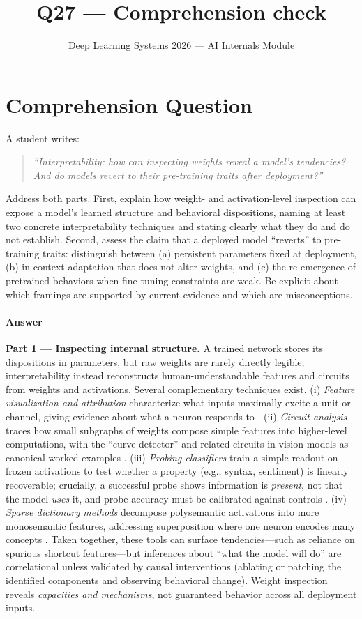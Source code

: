 \documentclass[11pt]{article}
\title{Q27 --- Comprehension check}
\author{Deep Learning Systems 2026 --- AI Internals Module}
\date{}
\begin{document}
\maketitle

\section*{Comprehension Question}

A student writes:

\begin{quote}
\emph{``Interpretability: how can inspecting weights reveal a model's tendencies? And do models revert to their pre-training traits after deployment?''}
\end{quote}

Address both parts. First, explain how weight- and activation-level inspection can expose a model's learned structure and behavioral dispositions, naming at least two concrete interpretability techniques and stating clearly what they do and do not establish. Second, assess the claim that a deployed model ``reverts'' to pre-training traits: distinguish between (a) persistent parameters fixed at deployment, (b) in-context adaptation that does not alter weights, and (c) the re-emergence of pretrained behaviors when fine-tuning constraints are weak. Be explicit about which framings are supported by current evidence and which are misconceptions.

\paragraph{Answer}
\textbf{Part 1 --- Inspecting internal structure.} A trained network stores its dispositions in parameters, but raw weights are rarely directly legible; interpretability instead reconstructs human-understandable features and circuits from weights and activations. Several complementary techniques exist. (i) \emph{Feature visualization and attribution} characterize what inputs maximally excite a unit or channel, giving evidence about what a neuron responds to \citep{olah2017feature}. (ii) \emph{Circuit analysis} traces how small subgraphs of weights compose simple features into higher-level computations, with the ``curve detector'' and related circuits in vision models as canonical worked examples \citep{olah2020zoom}. (iii) \emph{Probing classifiers} train a simple readout on frozen activations to test whether a property (e.g., syntax, sentiment) is linearly recoverable; crucially, a successful probe shows information is \emph{present}, not that the model \emph{uses} it, and probe accuracy must be calibrated against controls \citep{hewitt2019control}. (iv) \emph{Sparse dictionary methods} decompose polysemantic activations into more monosemantic features, addressing superposition where one neuron encodes many concepts \citep{elhage2022superposition}. Taken together, these tools can surface tendencies---such as reliance on spurious shortcut features---but inferences about ``what the model will do'' are correlational unless validated by causal interventions (ablating or patching the identified components and observing behavioral change). Weight inspection reveals \emph{capacities and mechanisms}, not guaranteed behavior across all deployment inputs.
\end{document}
